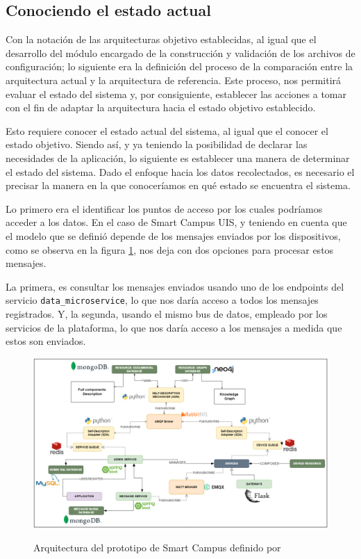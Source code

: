 \subsection{Conociendo el estado actual}

Con la notación de las arquitecturas objetivo establecidas, al igual que el desarrollo del módulo encargado de la construcción y validación de los archivos de configuración; lo siguiente era la definición del proceso de la comparación entre la arquitectura actual y la arquitectura de referencia. Este proceso, nos permitirá evaluar el estado del sistema y, por consiguiente, establecer las acciones a tomar con el fin de adaptar la arquitectura hacia el estado objetivo establecido.

Esto requiere conocer el estado actual del sistema, al igual que el conocer el estado objetivo. Siendo así, y ya teniendo la posibilidad de declarar las necesidades de la aplicación, lo siguiente es establecer una manera de determinar el estado del sistema. Dado el enfoque hacia los datos recolectados, es necesario el precisar la manera en la que conoceríamos en qué estado se encuentra el sistema.

Lo primero era el identificar los puntos de acceso por los cuales podríamos acceder a los datos. En el caso de Smart Campus UIS, y teniendo en cuenta que el modelo que se definió depende de los mensajes enviados por los dispositivos, como se observa en la figura \ref{fig:ArquitecturaSmartCampus}, nos deja con dos opciones para procesar estos mensajes. 

La primera, es consultar los mensajes enviados usando uno de los endpoints del servicio \texttt{data\_microservice}, lo que nos daría acceso a todos los mensajes registrados. Y, la segunda, usando el mismo bus de datos, empleado por los servicios de la plataforma, lo que nos daría acceso a los mensajes a medida que estos son enviados.

\begin{figure}[ht]
    \centering
    \caption{Arquitectura del prototipo de Smart Campus definido por }
    \includegraphics[width=\linewidth]{images/ArquitecturaSmartCampus.png}
    \label{fig:ArquitecturaSmartCampus}
\end{figure}

